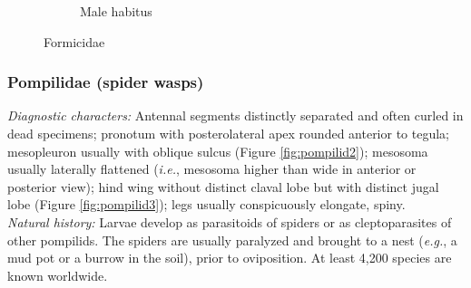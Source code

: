 \documentclass[letterpaper, 11pt]{article}
\begin{document}
\begin{figure}[ht!]
\begin{subfigure}[ht!]{0.35\textwidth}
        \caption{Male habitus \citep[][Fig. 92]{goulet1993hymenoptera}}
        \label{fig:formicid2}
    \end{subfigure}
    \caption{Formicidae}\label{fig:formicids}
\end{figure}

\subsubsection{Pompilidae (spider wasps)}
\noindent{}\textit{Diagnostic characters:} Antennal segments distinctly separated and often curled in dead specimens; pronotum with posterolateral apex rounded anterior to tegula; mesopleuron usually with oblique sulcus (Figure \ref{fig:pompilid2}); mesosoma usually laterally flattened (\textit{i.e.}, mesosoma higher than wide in anterior or posterior view); hind wing without distinct claval lobe but with distinct jugal lobe (Figure \ref{fig:pompilid3}); legs usually conspicuously elongate, spiny.\\

\noindent{}\textit{Natural history:} Larvae develop as parasitoids of spiders or as cleptoparasites of other pompilids. The spiders are usually paralyzed and brought to a nest (\textit{e.g.}, a mud pot or a burrow in the soil), prior to oviposition. At least 4,200 species are known worldwide.\\
\end{document}
